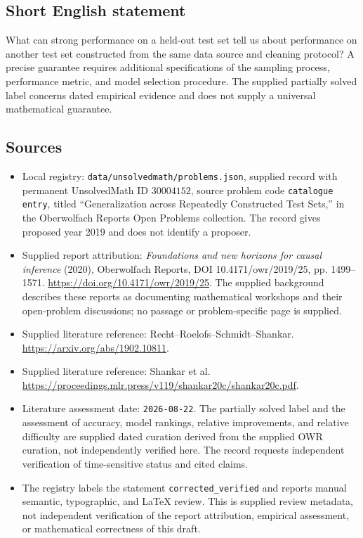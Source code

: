 \documentclass[11pt]{article}
\begin{document}
\subsection{Short English statement}
What can strong performance on a held-out test set tell us about performance on another test set constructed from the same data source and cleaning protocol? A precise guarantee requires additional specifications of the sampling process, performance metric, and model selection procedure. The supplied partially solved label concerns dated empirical evidence and does not supply a universal mathematical guarantee.
\subsection{Sources}
\begin{itemize}
\item Local registry: \texttt{data/unsolvedmath/problems.json}, supplied record with permanent UnsolvedMath ID \(30004152\), source problem code \texttt{catalogue entry}, titled ``Generalization across Repeatedly Constructed Test Sets,'' in the Oberwolfach Reports Open Problems collection. The record gives proposed year 2019 and does not identify a proposer.
\item Supplied report attribution: \emph{Foundations and new horizons for causal inference} (2020), Oberwolfach Reports, DOI 10.4171/owr/2019/25, pp. 1499--1571. \url{https://doi.org/10.4171/owr/2019/25}. The supplied background describes these reports as documenting mathematical workshops and their open-problem discussions; no passage or problem-specific page is supplied.
\item Supplied literature reference: Recht--Roelofs--Schmidt--Shankar. \url{https://arxiv.org/abs/1902.10811}.
\item Supplied literature reference: Shankar et al. \url{https://proceedings.mlr.press/v119/shankar20c/shankar20c.pdf}.
\item Literature assessment date: \texttt{2026-08-22}. The partially solved label and the assessment of accuracy, model rankings, relative improvements, and relative difficulty are supplied dated curation derived from the supplied OWR curation, not independently verified here. The record requests independent verification of time-sensitive status and cited claims.
\item The registry labels the statement \texttt{corrected\_verified} and reports manual semantic, typographic, and LaTeX review. This is supplied review metadata, not independent verification of the report attribution, empirical assessment, or mathematical correctness of this draft.
\end{itemize}
\end{document}
